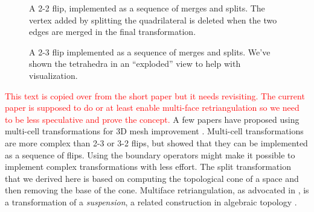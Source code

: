 \documentclass[twocolumn]{article}
\begin{document}
\begin{figure}[h]
\begin{center}
    \end{center}
    \caption{A 2-2 flip, implemented as a sequence of merges and splits.
    The vertex added by splitting the quadrilateral is deleted when the two edges are merged in the final transformation.}
    \label{fig:2-2-flip}
\end{figure}

\begin{figure}[h]
    \begin{center}
        
    \end{center}
    \caption{A 2-3 flip implemented as a sequence of merges and splits.
    We've shown the tetrahedra in an ``exploded'' view to help with visualization.}
    \label{fig:2-3-flip}
\end{figure}

\textcolor{red}{This text is copied over from the short paper but it needs revisiting.
The current paper is supposed to do or at least enable multi-face retriangulation so we need to be less speculative and prove the concept.}
A few papers have proposed using multi-cell transformations for 3D mesh improvement \cite{klingner2008aggressive}.
Multi-cell transformations are more complex than 2-3 or 3-2 flips, but \cite{misztal2009tetrahedral} showed that they can be implemented as a sequence of flips.
Using the boundary operators might make it possible to implement complex transformations with less effort.
The split transformation that we derived here is based on computing the topological cone of a space and then removing the base of the cone.
Multiface retriangulation, as advocated in \cite{misztal2009tetrahedral}, is a transformation of a \emph{suspension}, a related construction in algebraic topology \cite{hatcher2002algebraic}.
\end{document}
